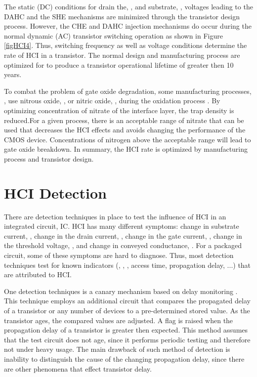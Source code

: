 \documentclass[12pt,conference]{IEEEtran}
\begin{document}
\begin{comment}
\begin{figure}[htp]
\centering{
\texttt{[image: Fig/trojanhci\_fig04.jpg]}
}
\caption{HCI recovery}
\label{figHCI4}
\end{figure}
\end{comment}
The static (DC) conditions for drain the, , and substrate, ,
voltages leading to the DAHC and the SHE mechanisms are
minimized through the transistor design process.  However, the CHE and DAHC
injection mechanisms do occur during the normal dynamic (AC) transistor
switching operation as shown in Figure \ref{figHCI4}.
Thus, switching frequency as well as voltage
conditions determine the rate of HCI in a transistor.  The normal design and manufacturing process are optimized for to produce a transistor operational lifetime of greater then 10 years. 

To combat the problem of gate oxide 
degradation, some manufacturing processes, ,
use nitrous oxide, , or nitric oxide, , during
the oxidation process \cite{NOX92A,NOX92B}.
By optimizing concentration of nitrate of the interface layer, the trap density is reduced.For a given process, there is an acceptable range of
nitrate that can be used that decreases the HCI effects and
avoids changing the performance of the CMOS device.
Concentrations of nitrogen above the acceptable range will lead to gate oxide breakdown. In summary, the HCI rate is optimized by manufacturing process and transistor design.   

\section*{HCI Detection}

There are detection techniques in place to test the influence of
HCI in an integrated circuit, IC.    HCI has many different symptoms: change in substrate
current, , change in the drain current, , change in the
gate current, , change in the threshold voltage, , and
change in conveyed conductance, .
For a packaged circuit, some of these symptoms are hard to diagnose.
Thus, most detection techniques test for known indicators (, , , access time, propagation delay, ...) that are
attributed to HCI.

One detection techniques is a canary mechanism based
on delay monitoring \cite{DELAY04A,DETECT06A,DELAY07A,DELAY08A}.
This technique employs an additional circuit that compares
the propagated delay of a transistor or any number of
devices to a pre-determined stored value.
As the transistor ages, the compared values are
adjusted.
A flag is raised when the propagation delay of a transistor
is greater then expected.  This method assumes that the test circuit does not age, since it performs periodic testing and therefore not under heavy usage.
The main drawback of such method of detection is inability to distinguish the cause of the changing propagation delay,  since there are other phenomena that effect transistor delay. 
\end{document}
